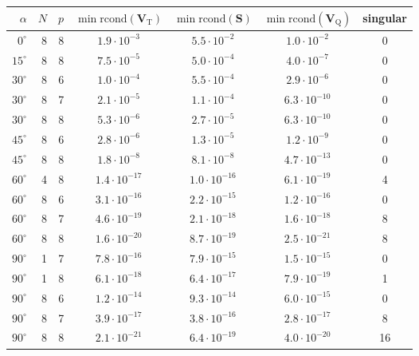 \begin{tabular}{@{}rrrcccc@{}}
\toprule
$\alpha$ & $N$ & $p$ & $\min\mathrm{rcond}(\bm V_{\mathrm{T}})$ & $\min\mathrm{rcond}(\bm S)$ & $\min\mathrm{rcond}(\bm V_{\mathrm{Q}})$ & singular\\
\midrule
$0^\circ$ & 8 & 8 & $1.9\cdot10^{-3}$ & $5.5\cdot10^{-2}$ & $1.0\cdot10^{-2}$ & 0\\
$15^\circ$ & 8 & 8 & $7.5\cdot10^{-5}$ & $5.0\cdot10^{-4}$ & $4.0\cdot10^{-7}$ & 0\\
$30^\circ$ & 8 & 6 & $1.0\cdot10^{-4}$ & $5.5\cdot10^{-4}$ & $2.9\cdot10^{-6}$ & 0\\
$30^\circ$ & 8 & 7 & $2.1\cdot10^{-5}$ & $1.1\cdot10^{-4}$ & $6.3\cdot10^{-10}$ & 0\\
$30^\circ$ & 8 & 8 & $5.3\cdot10^{-6}$ & $2.7\cdot10^{-5}$ & $6.3\cdot10^{-10}$ & 0\\
$45^\circ$ & 8 & 6 & $2.8\cdot10^{-6}$ & $1.3\cdot10^{-5}$ & $1.2\cdot10^{-9}$ & 0\\
$45^\circ$ & 8 & 8 & $1.8\cdot10^{-8}$ & $8.1\cdot10^{-8}$ & $4.7\cdot10^{-13}$ & 0\\
$60^\circ$ & 4 & 8 & $1.4\cdot10^{-17}$ & $1.0\cdot10^{-16}$ & $6.1\cdot10^{-19}$ & 4\\
$60^\circ$ & 8 & 6 & $3.1\cdot10^{-16}$ & $2.2\cdot10^{-15}$ & $1.2\cdot10^{-16}$ & 0\\
$60^\circ$ & 8 & 7 & $4.6\cdot10^{-19}$ & $2.1\cdot10^{-18}$ & $1.6\cdot10^{-18}$ & 8\\
$60^\circ$ & 8 & 8 & $1.6\cdot10^{-20}$ & $8.7\cdot10^{-19}$ & $2.5\cdot10^{-21}$ & 8\\
$90^\circ$ & 1 & 7 & $7.8\cdot10^{-16}$ & $7.9\cdot10^{-15}$ & $1.5\cdot10^{-15}$ & 0\\
$90^\circ$ & 1 & 8 & $6.1\cdot10^{-18}$ & $6.4\cdot10^{-17}$ & $7.9\cdot10^{-19}$ & 1\\
$90^\circ$ & 8 & 6 & $1.2\cdot10^{-14}$ & $9.3\cdot10^{-14}$ & $6.0\cdot10^{-15}$ & 0\\
$90^\circ$ & 8 & 7 & $3.9\cdot10^{-17}$ & $3.8\cdot10^{-16}$ & $2.8\cdot10^{-17}$ & 8\\
$90^\circ$ & 8 & 8 & $2.1\cdot10^{-21}$ & $6.4\cdot10^{-19}$ & $4.0\cdot10^{-20}$ & 16\\
\bottomrule
\end{tabular}
